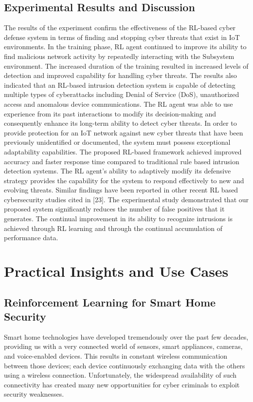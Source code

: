 \documentclass[12pt]{article}
\begin{document}
\subsection{Experimental Results and Discussion}
The results of the experiment confirm the effectiveness of the RL-based cyber defense system in terms of finding and stopping cyber threats that exist in IoT environments. In the training phase, RL agent continued to improve its ability to find malicious network activity by repeatedly interacting with the Subsystem environment. The increased duration of the training resulted in increased levels of detection and improved capability for handling cyber threats.
The results also indicated that an RL-based intrusion detection system is capable of detecting multiple types of cyberattacks including Denial of Service (DoS), unauthorized access and anomalous device communications. The RL agent was able to use experience from its past interactions to modify its decision-making and consequently enhance its long-term ability to detect cyber threats.
In order to provide protection for an IoT network against new cyber threats that have been previously unidentified or documented, the system must possess exceptional adaptability capabilities.
The proposed RL-based framework achieved improved accuracy and faster response time compared to traditional rule based intrusion detection systems. The RL agent's ability to adaptively modify its defensive strategy provides the capability for the system to respond effectively to new and evolving threats. Similar findings have been reported in other recent RL based cybersecurity studies cited in [23].
The experimental study demonstrated that our proposed system significantly reduces the number of false positives that it generates. The continual improvement in its ability to recognize intrusions is achieved through RL learning and through the continual accumulation of performance data.\cite{Zhang2024, Khan2023, Patel2024, Wang2023, Gupta2024, Sharma2023,Khan2023}

	

	\section{Practical Insights and Use Cases}
	\subsection{Reinforcement Learning for Smart Home Security}
    Smart home technologies have developed tremendously over the past few decades, providing us with a very connected world of sensors, smart appliances, cameras, and voice-enabled devices. This results in constant wireless communication between those devices; each device continuously exchanging data with the others using a wireless connection. Unfortunately, the widespread availability of such connectivity has created many new opportunities for cyber criminals to exploit security weaknesses.
\end{document}
